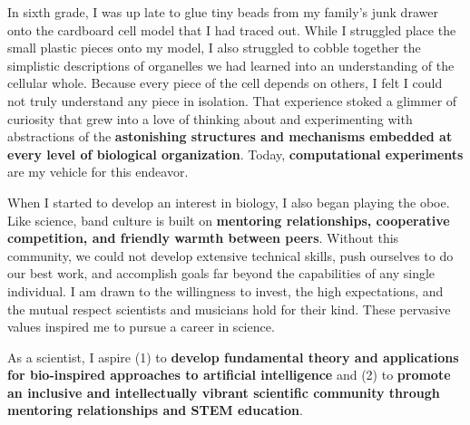 In sixth grade, I was up late to glue tiny beads from my family's junk drawer onto the cardboard cell model that I had traced out.
While I struggled place the small plastic pieces onto my model, I also struggled to cobble together the simplistic descriptions of organelles we had learned into an understanding of the cellular whole.
Because every piece of the cell depends on others, I felt I could not truly understand any piece in isolation.
That experience stoked a glimmer of curiosity that grew into a love of thinking about and experimenting with abstractions of the \textbf{astonishing structures and mechanisms embedded at every level of biological organization}.
Today, \textbf{computational experiments} are my vehicle for this endeavor.

When I started to develop an interest in biology, I also began playing the oboe.
Like science, band culture is built on \textbf{mentoring relationships, cooperative competition, and friendly warmth between peers}.
Without this community, we could not develop extensive technical skills, push ourselves to do our best work, and accomplish goals far beyond the capabilities of any single individual.
I am drawn to the willingness to invest, the high expectations, and the mutual respect scientists and musicians hold for their kind.
These pervasive values inspired me to pursue a career in science.

As a scientist, I aspire
(1) to \textbf{develop fundamental theory and applications for bio-inspired approaches to artificial intelligence} and
(2) to \textbf{promote an inclusive and intellectually vibrant scientific community through mentoring relationships and STEM education}.
